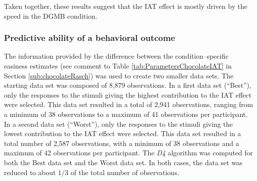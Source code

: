 \documentclass[12pt]{book}
\begin{document}
Taken together, these results suggest that the IAT effect is mostly driven by the speed in the DGMB condition.


\subsubsection{Predictive ability of a behavioral outcome}\label{subsub:choice1}

The information provided by the difference between the condition--specific easiness estimates (see comment to Table \ref{tab:ParametersChocolateIAT} in Section \ref{sub:chocolateRasch}) was used to create two smaller data sets. 
The starting data set was composed of 8,879 observations.
In a first data set (``Best''), only the responses to the stimuli giving the highest contribution to the IAT effect were selected. This data set resulted in a total of 2,941 observations, ranging from a minimum of 38 observations
to a maximum of 41 observations per participant. 
In a second data set (``Worst''), only the responses to the stimuli giving the lowest contribution to the IAT effect were selected. This data set resulted in a total number of 2,587 observations, with a minimum of 38 observations
and a maximum of 42 observations per participant. The \emph{D4} algorithm was computed for both the Best
data set and the Worst data set. 
In both cases, the data set was reduced to about $1/3$ of the total number of observations.
\end{document}
